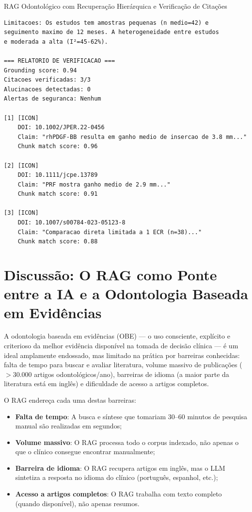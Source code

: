 \begin{pratica}{RAG Odontológico com Recuperação Hierárquica e Verificação de Citações}
\begin{lstlisting}[style=saida]
Limitacoes: Os estudos tem amostras pequenas (n medio=42) e
seguimento maximo de 12 meses. A heterogeneidade entre estudos
e moderada a alta (I²=45-62%).

=== RELATORIO DE VERIFICACAO ===
Grounding score: 0.94
Citacoes verificadas: 3/3
Alucinacoes detectadas: 0
Alertas de seguranca: Nenhum

[1] [ICON]
    DOI: 10.1002/JPER.22-0456
    Claim: "rhPDGF-BB resulta em ganho medio de insercao de 3.8 mm..."
    Chunk match score: 0.96

[2] [ICON]
    DOI: 10.1111/jcpe.13789
    Claim: "PRF mostra ganho medio de 2.9 mm..."
    Chunk match score: 0.91

[3] [ICON]
    DOI: 10.1007/s00784-023-05123-8
    Claim: "Comparacao direta limitada a 1 ECR (n=38)..."
    Chunk match score: 0.88
\end{lstlisting}
\end{pratica}


\section{Discussão: O RAG como Ponte entre a IA e a Odontologia Baseada em Evidências}

A odontologia baseada em evidências (OBE) --- o uso consciente, explícito e criterioso da melhor evidência disponível na tomada de decisão clínica --- é um ideal amplamente endossado, mas limitado na prática por barreiras conhecidas: falta de tempo para buscar e avaliar literatura, volume massivo de publicações ($>30.000$ artigos odontológicos/ano), barreiras de idioma (a maior parte da literatura está em inglês) e dificuldade de acesso a artigos completos.

O RAG endereça cada uma destas barreiras:
\begin{itemize}
    \item \textbf{Falta de tempo}: A busca e síntese que tomariam 30--60 minutos de pesquisa manual são realizadas em segundos;
    \item \textbf{Volume massivo}: O RAG processa todo o corpus indexado, não apenas o que o clínico consegue encontrar manualmente;
    \item \textbf{Barreira de idioma}: O RAG recupera artigos em inglês, mas o LLM sintetiza a resposta no idioma do clínico (português, espanhol, etc.);
    \item \textbf{Acesso a artigos completos}: O RAG trabalha com texto completo (quando disponível), não apenas resumos.
\end{itemize}

